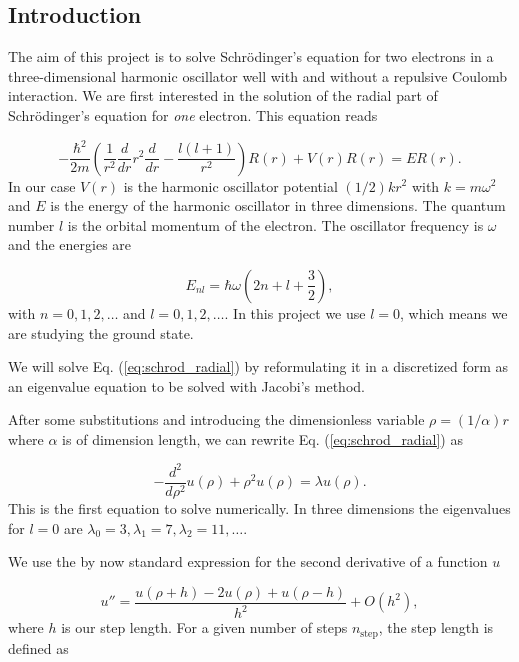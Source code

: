 \documentclass{article}
\begin{document}
\begin{multicols}{2}

\section{Introduction}
The aim of this project is to solve Schr\"odinger's equation for two electrons in a three-dimensional harmonic oscillator well with and without a repulsive Coulomb interaction. We are first interested in the solution of the radial part of Schr\"odinger's equation for \textit{one} electron. This equation reads

\begin{equation*}\label{eq:schrod_radial}
	-\frac{\hbar^2}{2 m} \left ( \frac{1}{r^2} \frac{d}{dr} r^2 \frac{d}{dr} - \frac{l (l + 1)}{r^2} \right )R(r) + V(r) R(r) = E R(r).
\end{equation*}
In our case $V(r)$ is the harmonic oscillator potential $(1/2)kr^2$ with $k=m\omega^2$ and $E$ is the energy of the harmonic oscillator in three dimensions. The quantum number $l$ is the orbital momentum of the electron. The oscillator frequency is $\omega$ and the energies are

\begin{equation*}
	E_{nl}=  \hbar \omega \left(2n+l+\frac{3}{2}\right),
\end{equation*}
with $n=0,1,2,\dots$ and $l=0,1,2,\dots$. In this project we use $l = 0$, which means we are studying the ground state. 

We will solve Eq. (\ref{eq:schrod_radial}) by reformulating it in a discretized form as an eigenvalue equation to be solved with Jacobi's method. 

After some substitutions and introducing the dimensionless variable $\rho = (1/ \alpha) r$ where $\alpha$ is of dimension length, we can rewrite Eq. (\ref{eq:schrod_radial}) as

\begin{equation*}
	-\frac{d^2}{d\rho^2} u(\rho) + \rho^2u(\rho)  = \lambda u(\rho) .
\end{equation*}
This is the first equation to solve numerically. In three dimensions the eigenvalues for $l=0$ are $\lambda_0=3,\lambda_1=7,\lambda_2=11,\dots .$

We use the by now standard expression for the second derivative of a function $u$

\begin{equation*}\label{eq:diffoperation}
    u''=\frac{u(\rho+h) -2u(\rho) +u(\rho-h)}{h^2} +O(h^2),
\end{equation*} 
where $h$ is our step length. For a given number of steps $n_{\mathrm{step}}$, the step length is defined as


\end{multicols}
\end{document}
